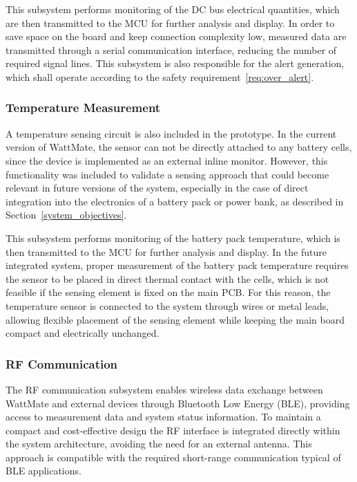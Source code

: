 This subsystem performs monitoring of the DC bus electrical quantities, which are then transmitted to the MCU for further analysis and display. In order to save space on the board and keep connection complexity low, measured data are transmitted through a serial communication interface, reducing the number of required signal lines. This subsystem is also responsible for the alert generation, which shall operate according to the safety requirement~\ref{req:over_alert}.

\subsubsection{Temperature Measurement}

A temperature sensing circuit is also included in the prototype. In the current version of WattMate, the sensor can not be directly attached to any battery cells, since the device is implemented as an external inline monitor. However, this functionality was included to validate a sensing approach that could become relevant in future versions of the system, especially in the case of direct integration into the electronics of a battery pack or power bank, as described in Section~\ref{system_objectives}. 

This subsystem performs monitoring of the battery pack temperature, which is then transmitted to the MCU for further analysis and display. In the future integrated system, proper measurement of the battery pack temperature requires the sensor to be placed in direct thermal contact with the cells, which is not feasible if the sensing element is fixed on the main PCB. For this reason, the temperature sensor is connected to the system through wires or metal leads, allowing flexible placement of the sensing element while keeping the main board compact and electrically unchanged.

\subsubsection{RF Communication}

The RF communication subsystem enables wireless data exchange between WattMate and external devices through Bluetooth Low Energy (BLE), providing access to measurement data and system status information. To maintain a compact and cost-effective design the RF interface is integrated directly within the system architecture, avoiding the need for an external antenna. This approach is compatible with the required short-range communication typical of BLE applications.

